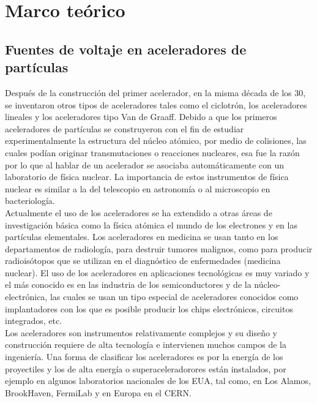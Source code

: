 

\chapter{Marco teórico}
\section{Fuentes de voltaje en aceleradores de partículas}

Después de la construcción del primer acelerador, en la misma década de los
30, se inventaron otros tipos de aceleradores tales como el ciclotrón, los
aceleradores lineales y los aceleradores tipo Van de Graaff. Debido a que los
primeros aceleradores de partículas se construyeron con el fin de estudiar
experimentalmente la estructura del núcleo atómico, por medio de colisiones, las cuales podían originar transmutaciones o reacciones nucleares, esa fue la razón por lo que al hablar de un acelerador se asociaba automáticamente con un laboratorio de física nuclear. La importancia de estos instrumentos de física nuclear es similar a la del telescopio en astronomía o al microscopio en bacteriología.\cite{C3}\\

Actualmente el uso de los aceleradores se ha extendido a otras áreas de investigación básica como la física atómica el mundo de los electrones y en las partículas elementales. Los aceleradores en medicina se usan tanto en los departamentos de radiología, para destruir tumores malignos, como para producir radioisótopos que se utilizan en el diagnóstico de enfermedades (medicina nuclear). El uso de los aceleradores en aplicaciones tecnológicas es muy variado y el más conocido es en las industria de los semiconductores y de la núcleo-electrónica, las cuales se usan un tipo especial de aceleradores conocidos como implantadores con los que es posible producir los chips electrónicos, circuitos integrados, etc. \cite{C4}\\

Los aceleradores son instrumentos relativamente complejos y su diseño y construcción requiere de alta tecnología e intervienen muchos campos de la ingeniería. Una forma de clasificar los aceleradores es por la energía de los proyectiles y los de alta energía o superaceleradorores están instalados, por ejemplo en algunos laboratorios nacionales de los EUA, tal como, en Los Alamos,
BrookHaven, FermiLab y en Europa en el CERN. \\

